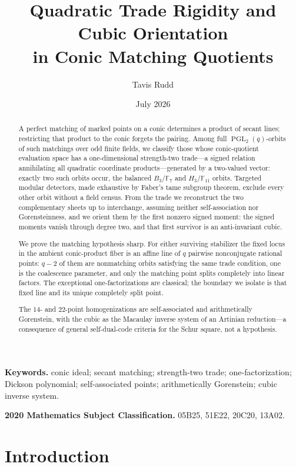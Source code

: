 \documentclass[11pt]{article}
\title{Quadratic Trade Rigidity and Cubic Orientation\\
in Conic Matching Quotients}
\author{Tavis Rudd}
\date{July 2026}
\theoremstyle{definition}
\theoremstyle{remark}
\newcommand{\F}{\mathbb{F}}
\begin{document}
\maketitle

\begin{abstract}
A perfect matching of marked points on a conic determines a product of secant
lines; restricting that product to the conic forgets the pairing.  Among full
\(\operatorname{PGL}_2(q)\)-orbits of such matchings over odd finite fields,
we classify those whose conic-quotient evaluation space has a one-dimensional
strength-two trade---a signed relation annihilating all quadratic coordinate
products---generated by a two-valued vector: exactly two such orbits occur, the balanced
\(B_3/\F_7\) and \(H_3/\F_{11}\) orbits.  Targeted modular detectors, made
exhaustive by Faber's tame subgroup theorem, exclude every other orbit without
a field census.  From the trade we reconstruct the two complementary sheets up
to interchange, assuming neither self-association nor Gorensteinness, and we
orient them by the first nonzero signed moment: the signed moments vanish
through degree two, and that first survivor is an anti-invariant cubic.

We prove the matching hypothesis sharp.  For either surviving stabilizer the
fixed locus in the ambient conic-product fiber is an affine line of \(q\)
pairwise nonconjugate rational points: \(q-2\) of them are nonmatching orbits
satisfying the same trade condition, one is the coalescence parameter, and
only the matching point splits completely into linear factors.  The exceptional
one-factorizations are classical; the boundary we isolate is that fixed line
and its unique completely split point.

The \(14\)- and \(22\)-point homogenizations are self-associated and
arithmetically Gorenstein, with the cubic as the Macaulay inverse system of an
Artinian reduction---a consequence of general self-dual-code criteria for the
Schur square, not a hypothesis.
\end{abstract}

\noindent\textbf{Keywords.} conic ideal; secant matching; strength-two
trade; one-factorization; Dickson polynomial; self-associated points;
arithmetically Gorenstein; cubic inverse system.

\smallskip
\noindent\textbf{2020 Mathematics Subject Classification.} 05B25, 51E22,
20C20, 13A02.

\section{Introduction}
\end{document}
